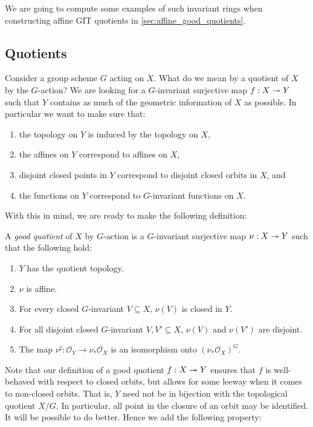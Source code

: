 \documentclass[12pt]{ociamthesis}  %
\begin{document}
We are going to compute some examples of such invariant rings when
constructing affine GIT quotients in \ref{sec:affine_good_quotients}.

\subsection{Quotients}

Consider a group scheme $G$ acting on $X$. What do we mean by a
quotient of $X$ by the $G$-action? We are looking for a $G$-invariant
surjective map $f : X\twoheadrightarrow Y$ such that $Y$ contains as much of the
geometric information of $X$ as possible. In particular
we want to make sure that:
\begin{enumerate}
  \item the topology on $Y$ is induced by the topology on $X$,
  \item the affines on $Y$ correspond to affines on $X$,
  \item disjoint closed points in $Y$ correspond to disjoint
        closed orbits in $X$, and
  \item the functions on $Y$ correspond to $G$-invariant functions
        on $X$.
\end{enumerate}
With this in mind, we are ready to make the following definition:

\begin{definition}\label{def:good_quotient}
  A \emph{good quotient} of $X$ by $G$-action is a $G$-invariant
  surjective map $\nu : X\twoheadrightarrow Y$ such that the following hold:
  \begin{enumerate}
    \item $Y$ has the quotient topology.
    \item $\nu$ is affine.
    \item For every closed $G$-invariant $V\subseteq X$,
          $\nu(V)$ is closed in $Y$.
    \item For all disjoint closed $G$-invariant $V,V'\subseteq X$,
          $\nu(V)$ and $\nu(V')$ are disjoint.
    \item The map $\nu^\sharp : \mathscr O_Y \to \nu_*\mathscr O_X$
          is an isomorphism onto $(\nu_*\mathscr O_X)^G$.
  \end{enumerate}
\end{definition}


Note that our definition of a good quotient $f : X\twoheadrightarrow Y$
ensures that $f$ is well-behaved with respect to closed orbits, but
allows for some leeway when it comes to non-closed orbits. That is,
$Y$ need not be in bijection with the topological quotient $X/G$. In particular,
all point in the closure of an orbit may be identified. It will be
possible to do better. Hence we add the following property:
\end{document}
